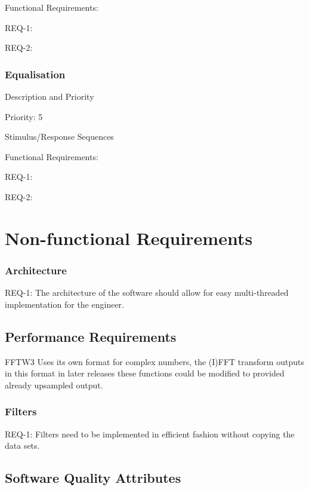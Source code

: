 \documentclass[]{report}
\begin{document}
Functional Requirements: \par
REQ-1:  \par 
REQ-2:  \par


\subsubsection{Equalisation}

Description and Priority
\par

Priority: 5  \par

Stimulus/Response Sequences \par

Functional Requirements: \par
REQ-1:  \par 
REQ-2:  \par

\pagebreak
\section{Non-functional Requirements}

\subsubsection{Architecture}

REQ-1: The architecture of the software should allow for easy multi-threaded implementation for the engineer. \par

\subsection{Performance Requirements}

FFTW3 Uses its own format for complex numbers, the (I)FFT transform outputs in this format in later releases these functions could be modified to provided already upsampled output.


\subsubsection{Filters}

REQ-1: Filters need to be implemented in efficient fashion without copying the data sets. \par


\subsection{Software Quality Attributes}
\end{document}
